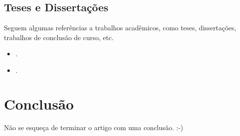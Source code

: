 \subsection{Teses e Dissertações}
Seguem algumas referências a trabalhos acadêmicos, como teses, dissertações, trabalhos de conclusão de curso, etc.
\begin{itemize}
	\item {}.
	\item {}.
\end{itemize}

\section{Conclusão}
Não se esqueça de terminar o artigo com uma conclusão. :-)
